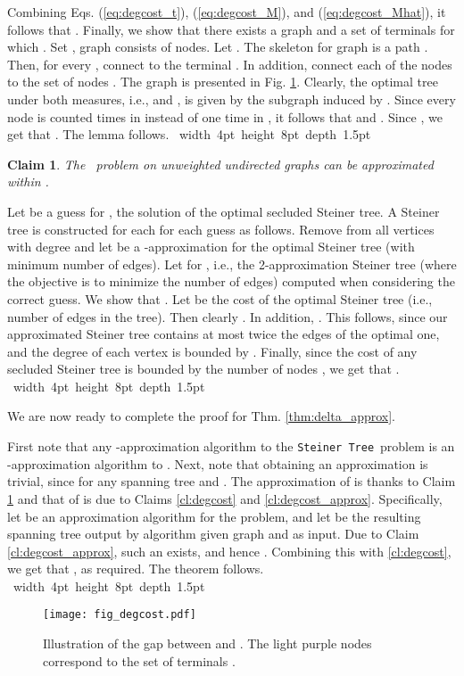 \documentclass[12pt]{article}
\newtheorem{claim}{Claim}[section]
\def\Proof{\par\noindent{\bf Proof:~}}
\def\blackslug{\hbox{\hskip 1pt \vrule width 4pt height 8pt
    depth 1.5pt \hskip 1pt}}
\def\QED{\quad\blackslug\lower 8.5pt\null\par}
\newcommand{\PS}[0]{ 
}
\newcommand{\Steiner}[0]{\mbox{\tt Steiner Tree}}
\begin{document}
Combining Eqs. (\ref{eq:degcost_t}), (\ref{eq:degcost_M}), and (\ref{eq:degcost_Mhat}), it follows that .
Finally, we show that there exists a graph  and a set of terminals  for which . Set , graph   consists of  nodes. Let . The skeleton for graph  is a path . Then, for every , connect  to the terminal . In addition, connect each of the  nodes to the set of nodes . The graph  is presented in Fig. \ref{fig:degcost_gap}. Clearly, the optimal tree  under both measures, i.e.,  and , is given by the subgraph induced by . Since every  node is counted  times in  instead of one time in , it follows that
 and . Since , we get that . The lemma follows.
\QED
\begin{claim}
\label{cl:steiner_sqrtn}
The \PS\ problem on unweighted undirected graphs can be approximated within .
\end{claim}
\Proof
Let  be a guess for , the solution of the optimal secluded Steiner tree. A Steiner tree  is constructed for each for each guess  as follows. Remove from  all vertices with degree  and let  be a -approximation for the optimal Steiner tree (with minimum number of edges). Let  for , i.e., the 2-approximation Steiner tree (where the objective is to minimize the number of edges) computed when considering the correct guess. We show that .  Let  be the cost of the optimal Steiner tree (i.e., number of edges in the tree). Then clearly .
In addition, . This follows, since our approximated Steiner tree  contains at most twice the edges of the optimal one, and the degree of each vertex is bounded by .
Finally, since the cost of any secluded Steiner tree is bounded by the number of nodes , we get that .
\QED
We are now ready to complete the proof for Thm. \ref{thm:delta_approx}.
\Proof
First note that any -approximation algorithm to the \Steiner\ problem is an -approximation algorithm to \PS. Next, note that obtaining an  approximation is trivial, since  for any spanning tree  and .
The approximation of  is thanks to Claim \ref{cl:steiner_sqrtn} and that of  is due to Claims \ref{cl:degcost} and \ref{cl:degcost_approx}. Specifically, let  be an  approximation algorithm for the  problem, and let  be the resulting spanning  tree output by algorithm  given graph  and  as input. Due to Claim \ref{cl:degcost_approx}, such an  exists, and hence . Combining this with \ref{cl:degcost}, we get that , as required. The theorem follows.
\QED

\begin{figure}[h!]
\begin{center}
\texttt{[image: fig\_degcost.pdf]}
\caption{ \label{fig:degcost_gap}
\sf
Illustration of the gap between  and .  The light purple nodes correspond to the set of terminals .
}
\end{center}
\end{figure}
\end{document}

